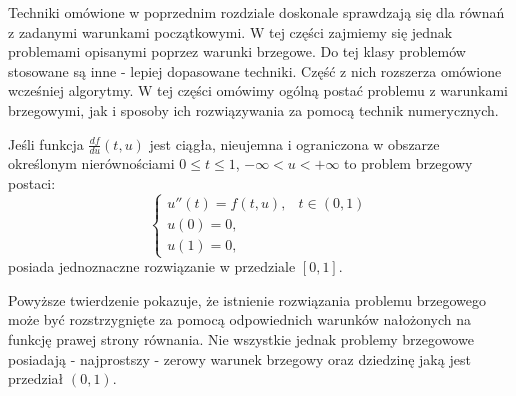 Techniki omówione w poprzednim rozdziale doskonale sprawdzają się dla równań z zadanymi warunkami początkowymi. W tej części zajmiemy się jednak problemami opisanymi poprzez warunki brzegowe. Do tej klasy problemów stosowane są inne - lepiej dopasowane techniki. Część z nich rozszerza omówione wcześniej algorytmy. W tej części omówimy ogólną postać problemu z warunkami brzegowymi, jak i sposoby ich rozwiązywania za pomocą technik numerycznych. 


\begin{theorem}
Jeśli funkcja $\frac{df}{du}(t,u)$ jest ciągła, nieujemna i ograniczona w obszarze określonym nierównościami $0\leq t \leq 1$, $-\infty < u < +\infty$ to problem brzegowy postaci:
\begin{equation}\label{zagad_brzeg}
\left\{\begin{array}{ll}
u''(t)=f(t,u), & t \in (0,1) \\
u(0)=0, & \\
u(1)=0,
\end{array}\right.
\end{equation}
posiada jednoznaczne rozwiązanie w przedziale $[0,1]$.
\end{theorem}
Powyższe twierdzenie pokazuje, że istnienie rozwiązania problemu brzegowego może być rozstrzygnięte za pomocą odpowiednich warunków nałożonych na funkcję prawej strony równania. Nie wszystkie jednak problemy brzegowowe posiadają - najprostszy - zerowy warunek brzegowy oraz dziedzinę jaką jest przedział $(0,1)$. 

